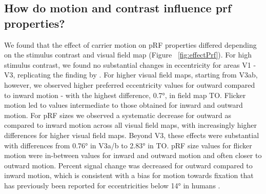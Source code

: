\subsection{How do motion and contrast influence prf properties?}
We found that the effect of carrier motion on pRF properties differed depending on the stimulus contrast and visual field map (Figure ~\ref{fig:effectPrf}). For high stimulus contrast, we found no substantial changes in eccentricity for areas V1 - V3, replicating the finding by \cite{Liu2006}. For higher visual field maps, starting from V3ab, however, we observed higher preferred eccentricity values for outward compared to inward motion - with the highest difference, 0.7°, in field map TO. Flicker motion led to values intermediate to those obtained for inward and outward motion. For pRF sizes we observed a systematic decrease for outward as compared to inward motion across all visual field maps, with increasingly higher differences for higher visual field maps. Beyond V3, these effects were substantial with differences from 0.76° in V3a/b to 2.83° in TO. pRF size values for flicker motion were in-between values for inward and outward motion and often closer to outward motion. Percent signal change was decreased for outward compared to inward motion, which is consistent with a bias for motion towards fixation that has previously been reported for eccentricities below 14° in humans \parencite{Wang2014}.

